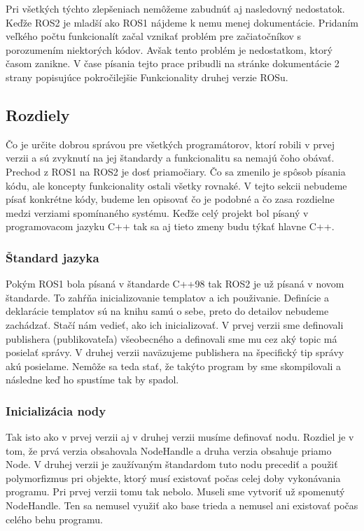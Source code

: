 Pri všetkých týchto zlepšeniach nemôžeme zabudnúť aj nasledovný nedostatok. Keďže ROS2 je mladší ako ROS1 nájdeme k nemu menej dokumentácie.
Pridaním veľkého počtu funkcionalít začal vznikať problém pre začiatočníkov s porozumením niektorých kódov. Avšak tento problém je nedostatkom,
ktorý časom zanikne. V čase písania tejto prace pribudli na stránke dokumentácie 2 strany popisujúce pokročilejšie Funkcionality druhej verzie ROSu.

\subsection{Rozdiely}

Čo je určite dobrou správou pre všetkých programátorov, ktorí robili v prvej verzii a sú zvyknutí na jej štandardy a funkcionalitu sa nemajú čoho obávať.
Prechod z ROS1 na ROS2 je dosť priamočiary. Čo sa zmenilo je spôsob písania kódu, ale koncepty funkcionality ostali všetky rovnaké. V tejto sekcii nebudeme
písať konkrétne kódy, budeme len opisovať čo je podobné a čo zasa rozdielne medzi verziami spomínaného systému. Keďže celý projekt bol písaný v programovacom
jazyku C++ tak sa aj tieto zmeny budu týkať hlavne C++.

\subsubsection{Štandard jazyka}
	Pokým ROS1 bola písaná v štandarde C++98 tak ROS2 je už písaná v novom štandarde. To zahŕňa inicializovanie templatov a ich použivanie. Definície
	a deklarácie templatov sú na knihu samú o sebe, preto do detailov nebudeme zachádzať. Stačí nám vedieť, ako ich inicializovať. V prvej verzii
	sme definovali publishera (publikovateľa) všeobecného a definovali sme mu cez aký topic má posielať správy. V druhej verzii naväzujeme publishera
	na špecifický tip správy akú posielame. Nemôže sa teda stať, že takýto program by sme skompilovali a následne keď ho spustíme tak by spadol.

\subsubsection{Inicializácia nody}
	Tak isto ako v prvej verzii aj v druhej verzii musíme definovať nodu. Rozdiel je v tom, že prvá verzia obsahovala NodeHandle a druha verzia obsahuje priamo Node.
	V druhej verzii je zaužívaným štandardom tuto nodu precediť a použiť polymorfizmus pri objekte, ktorý musí existovať počas celej doby vykonávania programu. Pri
	prvej verzii tomu tak nebolo. Museli sme vytvoriť už spomenutý NodeHandle. Ten sa nemusel využiť ako base trieda a nemusel ani existovať počas celého behu programu.

